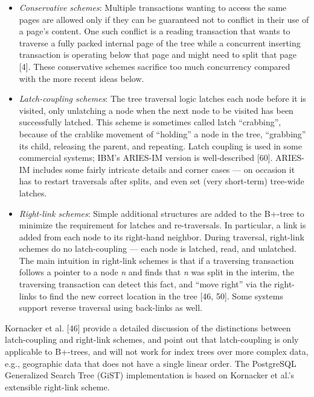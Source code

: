 \documentclass[b5paper,11pt,twoside,openright]{book}
\begin{document}
\begin{itemize}
\item
  \emph{Conservative schemes}: Multiple transactions wanting to access
  the same pages are allowed only if they can be guaranteed not to
  conflict in their use of a page's content. One such conflict is a
  reading transaction that wants to traverse a fully packed internal
  page of the tree while a concurrent inserting transaction is operating
  below that page and might need to split that page {[}4{]}. These
  conservative schemes sacrifice too much concurrency compared with the
  more recent ideas below.
\item
  \emph{Latch-coupling schemes}: The tree traversal logic latches each
  node before it is visited, only unlatching a node when the next node
  to be visited has been successfully latched. This scheme is sometimes
  called latch ``crabbing'', because of the crablike movement of
  ``holding'' a node in the tree, ``grabbing'' its child, releasing the
  parent, and repeating. Latch coupling is used in some commercial
  systems; IBM's ARIES-IM version is well-described {[}60{]}. ARIES-IM
  includes some fairly intricate details and corner cases --- on
  occasion it has to restart traversals after splits, and even set (very
  short-term) tree-wide latches.
\end{itemize}

\begin{itemize}

\item
  \emph{Right-link schemes}: Simple additional structures are added to
  the B+-tree to minimize the requirement for latches and re-traversals.
  In particular, a link is added from each node to its right-hand
  neighbor. During traversal, right-link schemes do no latch-coupling
  --- each node is latched, read, and unlatched. The main intuition in
  right-link schemes is that if a traversing transaction follows a
  pointer to a node \emph{n} and finds that \emph{n} was split in the
  interim, the traversing transaction can detect this fact, and ``move
  right'' via the right-links to find the new correct location in the
  tree {[}46, 50{]}. Some systems support reverse traversal using
  back-links as well.
\end{itemize}

Kornacker et al. {[}46{]} provide a detailed discussion of the
distinctions between latch-coupling and right-link schemes, and point
out that latch-coupling is only applicable to B+-trees, and will not
work for index trees over more complex data, e.g., geographic data that
does not have a single linear order. The PostgreSQL Generalized Search
Tree (GiST) implementation is based on Kornacker et al.'s extensible
right-link scheme.
\end{document}
